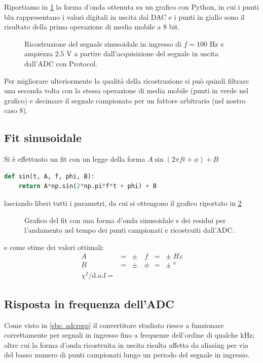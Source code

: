 \documentclass[10pt, a4paper, italian]{article}
\begin{document}
Riportiamo in \cref{fig: sin100hzpy} la forma d'onda ottenuta su un grafico
con Python, in cui i punti blu rappresentano i valori digitali in uscita dal
DAC e i punti in giallo sono il risultato della prima operazione di media
mobile a 8 bit.
\begin{figure}[htbp]
    \centering
    \caption{Ricostruzione del segnale sinusoidale in ingresso di $f = 100$
    Hz e ampiezza $2.5$ V a partire dall'acquisizione del segnale in uscita
    dall'ADC con Protocol.
    \label{fig: sin100hzpy}}
\end{figure}

Per migliorare ulteriormente la qualità della ricostruzione si può quindi
filtrare una seconda volta con la stessa operazione di media mobile (punti
in verde nel grafico) e decimare il segnale campionato per un fattore
arbitrario (nel nostro caso 8).

\subsection{Fit sinusoidale}
Si è effettuato un fit con un legge della forma $A\sin(2\pi f t + \phi) + B$
\begin{lstlisting}[language=Python]
def sin(t, A, f, phi, B):
    return A*np.sin(2*np.pi*f*t + phi) + B
\end{lstlisting}
lasciando liberi tutti i parametri, da cui si ottengono il grafico riportato 
in \ref{fig: sinfit}
\begin{figure}[htbp]
    \centering
    \caption{Grafico del fit con una forma d'onda sinusoidale e dei residui
    per l'andamento nel tempo dei punti campionati e ricostruiti dall'ADC.
    \label{fig: sinfit}}
\end{figure}
e come stime dei valori ottimali:
\begin{align*}
A &=& \pm \quad f &=& \pm \; \si{Hz} \\
B &=& \pm \quad \phi &=& \pm \; \si{\degree} \\
\chi^2/\text{d.o.f} = 
\end{align*}

\subsection{Risposta in frequenza dell'ADC}
\label{sbs: freq}
Come visto in \cref{sbs: adcresp} il convertitore studiato riesce a funzionare
correttamente per segnali in ingresso fino a frequenze dell'ordine di qualche
kHz; oltre cui la forma d'onda ricostruita in uscita risulta affetta da
aliasing per via del basso numero di punti campionati lungo un periodo del
segnale in ingresso.
\end{document}
